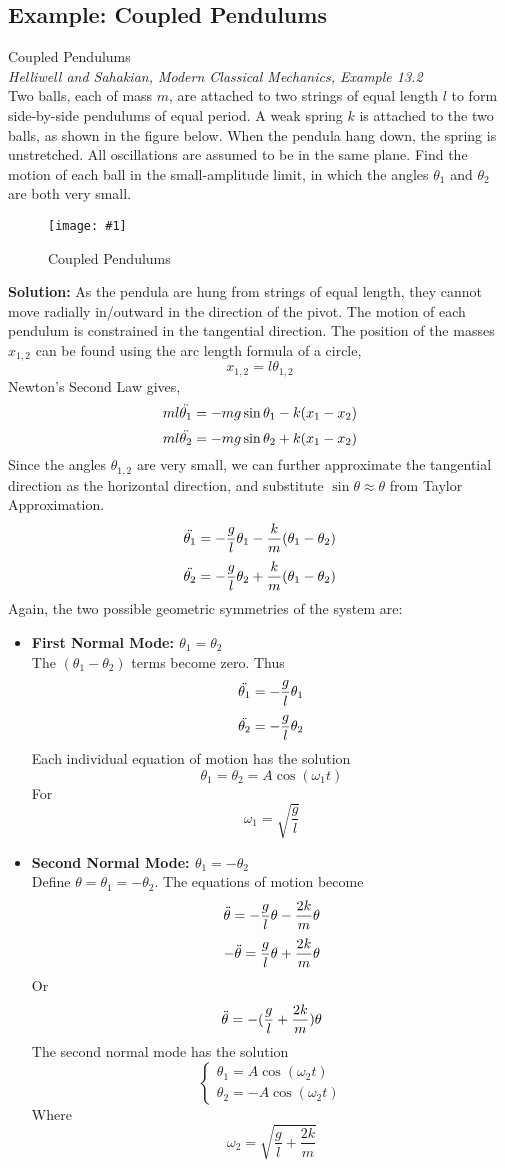 \documentclass[11pt]{article}
\newcommand{\fig}[4]{
    \begin{figure}[H]
        \centering
        \texttt{[image: \#1]}
        \caption{#2}
        \label{exp4fit}
    \end{figure}
}
\theoremstyle{gangnamstyle}{\newtheorem{definition}{Definition}[]}
\theoremstyle{gangnamstyle}{\newtheorem{example}{Example}[]}
\theoremstyle{gangnamstyle}{\newtheorem{problem}{Problem}[]}
\theoremstyle{gangnamstyle}{\newtheorem{warning}{Warning}[]}
\begin{document}
\subsection{Example: Coupled Pendulums}
\begin{example}
Coupled Pendulums \\
\textit{Helliwell and Sahakian, Modern Classical Mechanics, Example 13.2} \\
Two balls, each of mass $m$, are attached to two strings of equal length $l$ to form side-by-side pendulums of equal period. A weak spring $k$ is attached to the two balls, as shown in the figure below. When the pendula hang down, the spring is unstretched. All oscillations are assumed to be in the same plane. Find the motion of each ball in the small-amplitude limit, in which the angles $\theta_1$ and $\theta_2$ are both very small. 
\fig{figs/n3/pendulum.jpg}{Coupled Pendulums}{0.5}{0}
\textbf{Solution:} As the pendula are hung from strings of equal length, they cannot move radially in/outward in the direction of the pivot. The motion of each pendulum is constrained in the tangential direction. The position of the masses $x_{1, 2}$ can be found using the arc length formula of a circle, 
\[ x_{1, 2} = l\theta_{1, 2} \]
Newton's Second Law gives, 
\[ ml\Ddot{\theta_1} = -mg\sin\theta_1 - k(x_1 - x_2) \]
\[ ml\Ddot{\theta_2} = -mg\sin\theta_2 + k(x_1 - x_2) \]
Since the angles $\theta_{1, 2}$ are very small, we can further approximate the tangential direction as the horizontal direction, and substitute $\sin\theta \approx \theta$ from Taylor Approximation. 
\[ \Ddot{\theta_1} = -\frac{g}{l}\theta_1 - \frac{k}{m}(\theta_1 - \theta_2) \]
\[ \Ddot{\theta_2} = -\frac{g}{l}\theta_2 + \frac{k}{m}(\theta_1 - \theta_2) \]
Again, the two possible geometric symmetries of the system are: 
\begin{itemize}
\item \textbf{First Normal Mode: $\theta_1 = \theta_2$} \\
The $(\theta_1 - \theta_2)$ terms become zero. Thus
\[ \Ddot{\theta_1} = -\frac{g}{l}\theta_1 \]
\[ \Ddot{\theta_2} = -\frac{g}{l}\theta_2 \]
Each individual equation of motion has the solution
\[ \theta_1 = \theta_2 = A\cos(\omega_1 t) \]
For 
\[ \omega_1 = \sqrt{\frac{g}{l}} \]
\item \textbf{Second Normal Mode: $\theta_1 = - \theta_2$} \\
Define $\theta = \theta_1 = -\theta_2$. The equations of motion become
\[ \Ddot{\theta} = -\frac{g}{l}\theta - \frac{2k}{m}\theta \]
\[ -\Ddot{\theta} = \frac{g}{l}\theta + \frac{2k}{m}\theta \]
Or
\[ \Ddot{\theta} = -(\frac{g}{l} + \frac{2k}{m})\theta \]
The second normal mode has the solution
\[ \begin{cases}
\theta_1 = A\cos(\omega_2 t) \\
\theta_2 = - A\cos(\omega_2 t)
\end{cases} \]
Where
\[ \omega_2 = \sqrt{\frac{g}{l} + \frac{2k}{m}} \]
\end{itemize}
\end{example}
\end{document}
